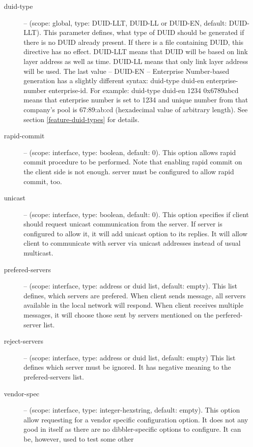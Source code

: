 \begin{description}
 \item[duid-type] -- (scope: global, type: DUID-LLT, DUID-LL or DUID-EN,
	    default: DUID-LLT). This parameter defines, what type of
	    DUID should be generated if there is no DUID already
	    present. If there is a file containing DUID, this directive
	    has no effect. DUID-LLT means that DUID will be based on
	    link layer address as well as time. DUID-LL means that only
	    link layer address will be used. The last value -- DUID-EN
	    -- Enterprise Number-based generation has a slightly
            different syntax: duid-type duid-en enterprise-number
            enterprise-id. For example: duid-type duid-en 1234 0x6789abcd
            means that enterprise number is set to 1234 and unique
            number from that company's pool is 67:89:ab:cd
            (hexadecimal value of arbitrary length). See section
            \ref{feature-duid-types} for details.
 \item[rapid-commit] -- (scope: interface, type: boolean, default:
	    0). This option allows rapid commit procedure to be
	    performed. Note that enabling rapid commit on the client
	    side is not enough. server must be configured to allow
	    rapid commit, too.
 \item[unicast] -- (scope: interface, type: boolean, default: 0). This
	    option specifies if client should request unicast
	    communication from the server. If server is configured to
	    allow it, it will add unicast option to its replies. It will
	    allow client to communicate with server via unicast
	    addresses instead of usual multicast.
 \item[prefered-servers] -- (scope: interface, type: address or duid list, default:
	    empty). This list defines, which servers are prefered. When
	    client sends  message, all servers available in
	    the local network will respond. When client receives
	    multiple  messages, it will choose those sent
	    by servers mentioned on the perfered-server list.
 \item[reject-servers] -- (scope: interface, type: address or duid list, default:
	    empty) This list defines which server must be ignored. It
	    has negative meaning to the prefered-servers list.
 \item[vendor-spec] -- (scope: interface, type: integer-hexstring,
	    default: empty). This option allow requesting for a vendor
	    specific configuration option. It does not any good in
	    itself as there are no dibbler-specific options to
	    configure. It can be, however, used to test some other

\end{description}
